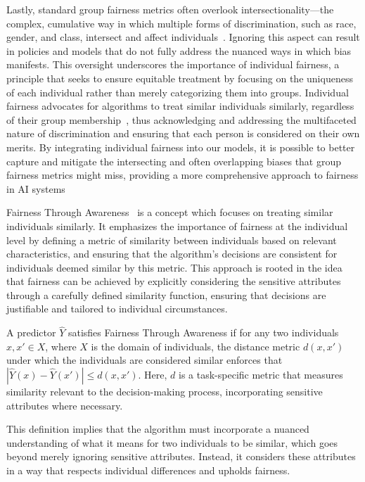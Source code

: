 Lastly, standard group fairness metrics often overlook intersectionality—the complex, cumulative way in which multiple forms of discrimination, such as race, gender, and class, intersect and affect individuals~\citep{Kearns2017,Kearns2018}. Ignoring this aspect can result in policies and models that do not fully address the nuanced ways in which bias manifests. This oversight underscores the importance of individual fairness, a principle that seeks to ensure equitable treatment by focusing on the uniqueness of each individual rather than merely categorizing them into groups. Individual fairness advocates for algorithms to treat similar individuals similarly, regardless of their group membership~\cite{Mehrabi2019}, thus acknowledging and addressing the multifaceted nature of discrimination and ensuring that each person is considered on their own merits. By integrating individual fairness into our models, it is possible to better capture and mitigate the intersecting and often overlapping biases that group fairness metrics might miss, providing a more comprehensive approach to fairness in AI systems

Fairness Through Awareness~\citep{Dwork2011} is a concept which focuses on treating similar individuals similarly. It emphasizes the importance of fairness at the individual level by defining a metric of similarity between individuals based on relevant characteristics, and ensuring that the algorithm's decisions are consistent for individuals deemed similar by this metric. This approach is rooted in the idea that fairness can be achieved by explicitly considering the sensitive attributes through a carefully defined similarity function, ensuring that decisions are justifiable and tailored to individual circumstances.


\begin{definition}\label{def:fta}
A predictor $\hat{Y}$ satisfies Fairness Through Awareness if for any two individuals $x, x' \in X$, where $X$ is the domain of individuals, the distance metric $d(x, x')$ under which the individuals are considered similar enforces that $|\hat{Y}(x) - \hat{Y}(x')| \leq d(x, x')$. Here, $d$ is a task-specific metric that measures similarity relevant to the decision-making process, incorporating sensitive attributes where necessary.
\end{definition}

This definition implies that the algorithm must incorporate a nuanced understanding of what it means for two individuals to be similar, which goes beyond merely ignoring sensitive attributes. Instead, it considers these attributes in a way that respects individual differences and upholds fairness.


